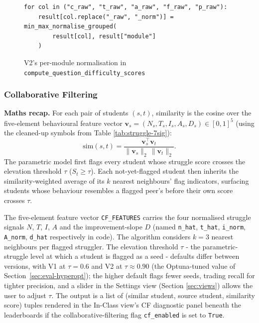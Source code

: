 \begin{figure}[H]
    \centering
    \begin{minipage}{0.92\linewidth}
\begin{lstlisting}[firstnumber=94]
for col in ("c_raw", "t_raw", "a_raw", "f_raw", "p_raw"):
    result[col.replace("_raw", "_norm")] = min_max_normalise_grouped(
        result[col], result["module"]
    )
\end{lstlisting}
    \end{minipage}
    \caption{V2's per-module normalisation in \texttt{compute\_question\_difficulty\_scores}}
    \label{fig:code-permodule}
\end{figure}

\subsubsection{Collaborative Filtering}

\textbf{Maths recap.}
For each pair of students $(s, t)$, similarity is the cosine over the five-element behavioural feature vector $\mathbf{v}_s = (N_s, T_s, I_s, A_s, D_s) \in [0,1]^5$ (using the cleaned-up symbols from Table \ref{tab:struggle-7sig}):
\[
\mathrm{sim}(s, t) = \frac{\mathbf{v}_s^{\top} \mathbf{v}_t}{\lVert \mathbf{v}_s \rVert_2 \, \lVert \mathbf{v}_t \rVert_2}.
\]
The parametric model first flags every student whose struggle score crosses the elevation threshold $\tau$ ($S_t \geq \tau$). Each not-yet-flagged student then inherits the similarity-weighted average of its $k$ nearest neighbours' flag indicators, surfacing students whose behaviour resembles a flagged peer's before their own score crosses $\tau$.

The five-element feature vector \texttt{CF\_FEATURES} carries the four normalised struggle signals $N$, $T$, $I$, $A$ and the improvement-slope $D$ (named \texttt{n\_hat}, \texttt{t\_hat}, \texttt{i\_norm}, \texttt{A\_norm}, \texttt{d\_hat} respectively in code).
The algorithm considers $k = 3$ nearest neighbours per flagged struggler.
The elevation threshold $\tau$ - the parametric-struggle level at which a student is flagged as a seed - defaults differ between versions, with V1 at $\tau = 0.6$ and V2 at $\tau \approx 0.90$ (the Optuna-tuned value of Section~\ref{sec:eval-hyperopt}); the higher default flags fewer seeds, trading recall for tighter precision, and a slider in the Settings view (Section \ref{sec:views}) allows the user to adjust $\tau$.
The output is a list of (similar student, source student, similarity score) tuples rendered in the In-Class view's CF diagnostic panel beneath the leaderboards if the collaborative-filtering flag \texttt{cf\_enabled} is set to \texttt{True}.



